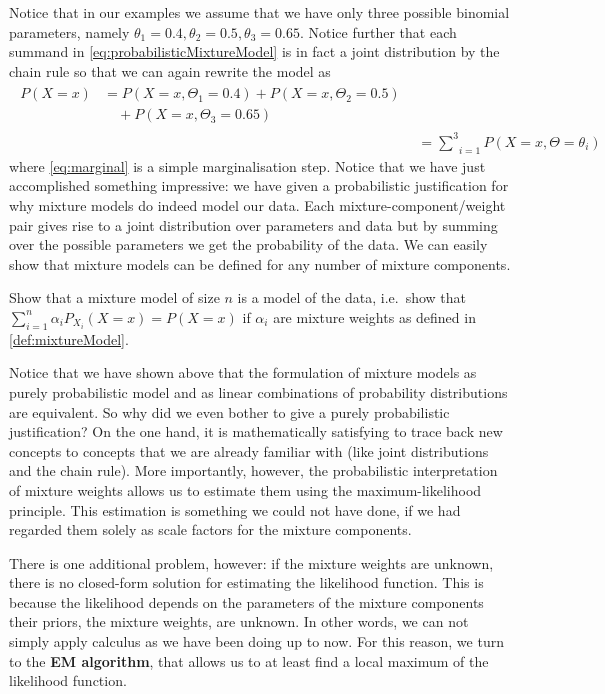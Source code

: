 Notice that in our examples we assume that we have only three possible binomial parameters, namely $ \theta_{1} = 0.4, \theta_{2} = 0.5, \theta_{3} = 0.65 $. 
Notice further that each summand
in \eqref{eq:probabilisticMixtureModel} is in fact a joint distribution by the chain rule so that we can again rewrite the model as
\begin{align}
\begin{split}\label{eq:marginal}
P(X=x) &= P(X=x,\Theta_{1}=0.4) + P(X=x,\Theta_{2}=0.5)  \\
&\quad + P(X=x,\Theta_{3}=0.65)
\end{split} \\
&= \underset{i=1}{\overset{3}{{\sum}}} P(X=x,\Theta=\theta_{i}) \nonumber
\end{align}
where \eqref{eq:marginal} is a simple marginalisation step. Notice that we have just accomplished something impressive: we have given a probabilistic justification
for why mixture models do indeed model our data. Each mixture-component/weight pair gives rise to a joint distribution over parameters and data but by summing over the 
possible parameters we get the probability of the data. We can easily show that mixture models can be defined for any number of mixture components.

\begin{Exercise}
Show that a mixture model of size $ n $ is a model of the data, i.e.\ show that $  \sum_{i=1}^n \alpha_{i}P_{X_{i}}(X=x) = P(X=x) $ if $ \alpha_{i} $ are mixture weights as 
defined in \eqref{def:mixtureModel}.
\end{Exercise}

Notice that we have shown above that the formulation of mixture models as purely probabilistic model and as linear combinations of probability distributions are
equivalent. So why did we even bother to give a purely probabilistic justification? On the one hand, it is mathematically satisfying to trace back new concepts
to concepts that we are already familiar with (like joint distributions and the chain rule). More importantly, however, the probabilistic interpretation of mixture
weights allows us to estimate them using the maximum-likelihood principle. This estimation is something we could not have done, if we had regarded them solely as scale factors
for the mixture components. 

There is one additional problem, however: if the mixture weights are unknown, there is no closed-form solution for estimating the likelihood function. This is because
the likelihood depends on the parameters of the mixture components their priors, the mixture weights, are unknown. In other words, we can not simply apply calculus as we have been doing up to now. For this reason, we turn to the \textbf{EM algorithm}, that allows
us to at least find a local maximum of the likelihood function.


